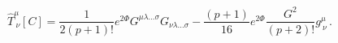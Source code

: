 \begin{equation}\label{hat_Ramond_stress}
{\hat{T}}^{\mu}_{\ \nu}[C] = {\frac{1}{2(p+1)!}} e^{2\Phi}
G^{\mu\lambda\ldots\sigma} G_{\nu\lambda\ldots\sigma}
-{\frac{(p+1)}{16}} e^{2\Phi} {\frac{G^{2}}{(p+2)!}} g^{\mu}_{\
\nu} \, .
\end{equation}

